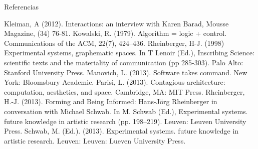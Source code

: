 Referencias

Kleiman, A (2012). Interactions: an interview with Karen Barad, Mousse Magazine, (34) 76-81.
Kowalski, R. (1979). Algorithm = logic + control. Communications of the ACM, 22(7), 424–436.
Rheinberger, H-J. (1998) Experimental systems, graphematic spaces. In T Lenoir (Ed.), Inscribing Science: scientific texts and the materiality of communication (pp 285-303). Palo Alto: Stanford University Press.
Manovich, L. (2013). Software takes command. New York: Bloomsbury Academic.
Parisi, L. (2013). Contagious architecture: computation, aesthetics, and space. Cambridge, MA:
MIT Press.
Rheinberger, H.-J. (2013). Forming and Being Informed: Hans-Jörg Rheinberger in conversation with Michael Schwab. In M. Schwab (Ed.), Experimental systems. future knowledge in artistic research (pp. 198–219). Leuven: Leuven University Press.
Schwab, M. (Ed.). (2013). Experimental systems. future knowledge in artistic research. Leuven: Leuven: Lueven University Press.

